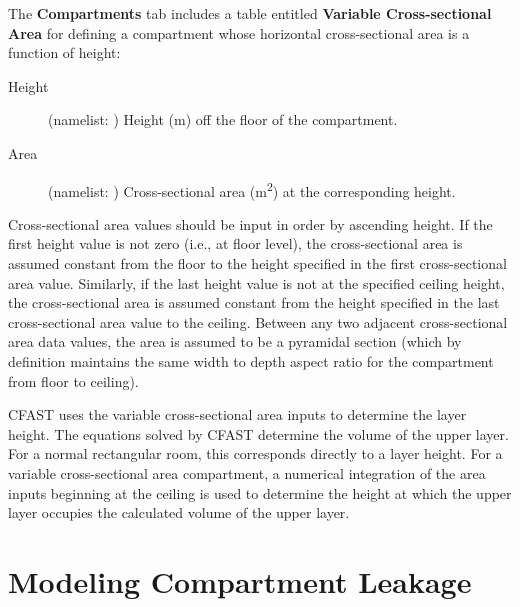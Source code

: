 The \textbf{Compartments} tab includes a table entitled \textbf{Variable Cross-sectional Area} for defining a compartment whose horizontal cross-sectional area is a function of height:
\begin{description}
\item[Height] (namelist: ) Height (m) off the floor of the compartment.
\item[Area] (namelist: ) Cross-sectional area (\unit{m^2}) at the corresponding height.
\end{description}
Cross-sectional area values should be input in order by ascending height. If the first height value is not zero (i.e., at floor level), the cross-sectional area is assumed constant from the floor to the height specified in the first cross-sectional area value. Similarly, if the last height value is not at the specified ceiling height, the cross-sectional area is assumed constant from the height specified in the last cross-sectional area value to the ceiling. Between any two adjacent cross-sectional area data values, the area is assumed to be a pyramidal section (which by definition maintains the same width to depth aspect ratio for the compartment from floor to ceiling).

CFAST uses the variable cross-sectional area inputs to determine the layer height. The equations solved by CFAST determine the volume of the upper layer. For a normal rectangular room, this corresponds directly to a layer height. For a variable cross-sectional area compartment, a numerical integration of the area inputs beginning at the ceiling is used to determine the height at which the upper layer occupies the calculated volume of the upper layer.




\section{Modeling Compartment Leakage}
\label{info:COMP5}

